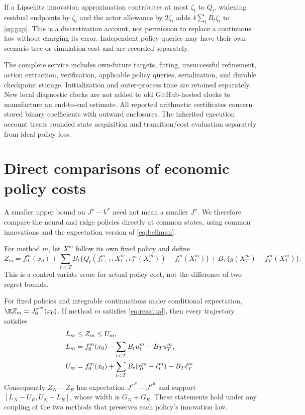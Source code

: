 \documentclass[ecta,nameyear,draft]{econsocart}
\begin{document}
If a Lipschitz innovation approximation contributes at most $\zeta_t$ to $Q_t$, widening residual endpoints by $\zeta_t$ and the actor allowance by $2\zeta_t$ adds $4\sum_tB_t\zeta_t$ to \eqref{eq:gap}. This is a discretization account, not permission to replace a continuous law without charging its error. Independent policy queries may have their own scenario-tree or simulation cost and are recorded separately.

The complete service includes own-future targets, fitting, unsuccessful refinement, action extraction, verification, applicable policy queries, serialization, and durable checkpoint storage. Initialization and outer-process time are retained separately. New local diagnostic clocks are not added to old GitHub-hosted clocks to manufacture an end-to-end estimate. All reported arithmetic certificates concern stored binary coefficients with outward enclosures. The inherited execution account treats rounded state acquisition and transition/cost evaluation separately from ideal policy loss.

\section{Direct comparisons of economic policy costs}\label{sec:paired}
A smaller upper bound on $J^\pi-V^*$ need not mean a smaller $J^\pi$. We therefore compare the neural and ridge policies directly at common states, using common innovations and the expectation version of \eqref{eq:bellman}.

For method $m$, let $X^m$ follow its own fixed policy and define
\begin{equation}\label{eq:score}
 Z_m=f_0^m(x_0)+\sum_{t<T}B_t
  \{Q_t(f_{t+1}^m;X_t^m,\pi_t^m(X_t^m))-f_t^m(X_t^m)\}
       +B_T\{g(X_T^m)-f_T^m(X_T^m)\}.
\end{equation}
This is a control-variate score for actual policy cost, not the difference of two regret bounds.

\begin{theorem}\label{thm:paired}
For fixed policies and integrable continuations under conditional expectation,
$\E Z_m=J^{\pi^m}_0(x_0)$. If method $m$ satisfies \eqref{eq:residual}, then every trajectory satisfies
\begin{align}\label{eq:support}
 L_m&\leq Z_m\leq U_m,\\
 L_m&=f_0^m(x_0)-\sum_{t<T}B_tu_t^m-B_Tu_T^m,\notag\\
 U_m&=f_0^m(x_0)+\sum_{t<T}B_t(\eta_t^m-\ell_t^m)-B_T\ell_T^m.\notag
\end{align}
Consequently $Z_N-Z_R$ has expectation $J^{\pi^N}-J^{\pi^R}$ and support
$[L_N-U_R,U_N-L_R]$, whose width is $G_N+G_R$. These statements hold under any coupling of the two methods that preserves each policy's innovation law.
\end{theorem}
\end{document}
